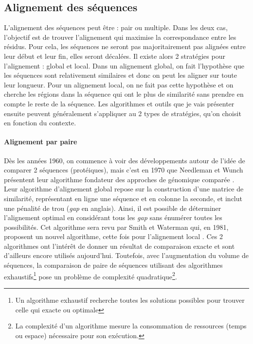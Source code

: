 \subsection{Alignement des séquences}

L'alignement des séquences peut être : pair ou multiple. Dans les deux cas, l'objectif est de trouver l'alignement qui maximise la correspondance entre les résidus. Pour cela, les séquences ne seront pas majoritairement pas alignées entre leur début et leur fin, elles seront décalées. Il existe alors 2 stratégies pour l'alignement : global et local. Dans un alignement global, on fait l'hypothèse que les séquences sont relativement similaires et donc on peut les aligner sur toute leur longueur.%
Pour un alignement local, on ne fait pas cette hypothèse et on cherche les régions dans la séquence qui ont le plus de similarité sans prendre en compte le reste de la séquence. Les algorithmes et outils que je vais présenter ensuite peuvent généralement s'appliquer au 2 types de stratégies, qu'on choisit en fonction du contexte.

\paragraph{Alignement par paire}

Dès les années 1960, on commence à voir des développements autour de l'idée de comparer 2 séquences (protéiques), mais c'est en 1970 que Needleman et Wunch présentent leur algorithme fondateur des approches de génomique comparée \cite{needleman_general_1970}. Leur algorithme d'alignement global repose sur la construction d'une matrice de similarité, représentant en ligne une séquence et en colonne la seconde, et inclut une pénalité de trou (\textit{gap} en anglais). Ainsi, il est possible de déterminer l'alignement optimal en considérant tous les \textit{gap} sans énumérer toutes les possibilités. Cet algorithme sera revu par Smith et Waterman qui, en 1981, proposent un nouvel algorithme, cette fois pour l'alignement local \cite{smith_identification_1981}. Ces 2 algorithmes ont l'intérêt de donner un résultat de comparaison exacte et sont d'ailleurs encore utilisés aujourd'hui. Toutefois, avec l'augmentation du volume de séquences, la comparaison de paire de séquences utilisant des algorithmes exhaustifs\footnote{Un algorithme exhaustif recherche toutes les solutions possibles pour trouver celle qui exacte ou optimale} pose un problème de complexité quadratique\footnote{La complexité d'un algorithme mesure la consommation de ressources (temps ou espace) nécessaire pour son exécution.}.

